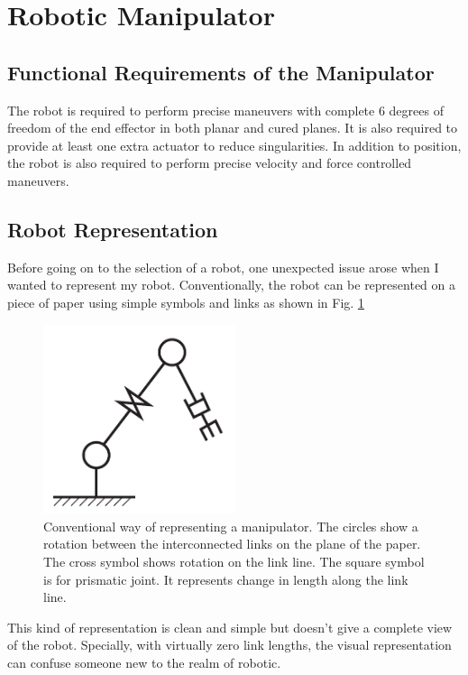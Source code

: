 \section{Robotic Manipulator}
{
    \subsection{Functional Requirements of the Manipulator}
    {
        The robot is required to perform precise maneuvers with complete $6$ degrees of freedom of the end effector in both planar and cured planes. It is also required to provide at least one extra actuator to reduce singularities. In addition to position, the robot is also required to perform precise velocity and force controlled maneuvers.
    }
    \subsection{Robot Representation}
    {
        Before going on to the selection of a robot, one unexpected issue arose when I wanted to represent my robot. Conventionally, the robot can be represented on a piece of paper using simple symbols and links as shown in Fig. \ref{FigConventionalRep}
        \begin{figure}
          \centering
          \includegraphics[width=0.5\textwidth]{RobotRep1.pdf}
          \caption{Conventional way of representing a manipulator. The circles show a rotation between the interconnected links on the plane of the paper. The cross symbol shows rotation on the link line. The square symbol is for prismatic joint. It represents change in length along the link line.}\label{FigConventionalRep}
        \end{figure}
        This kind of representation is clean and simple but doesn't give a complete view of the robot. Specially, with virtually zero link lengths, the visual representation can confuse someone new to the realm of robotic.

}}
